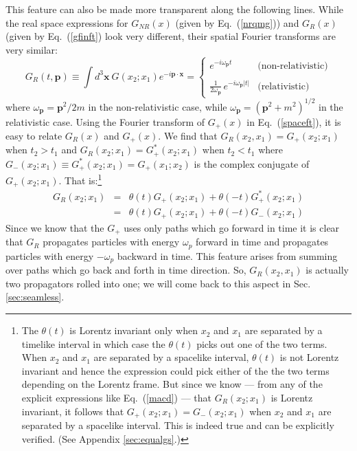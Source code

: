 \documentclass{article}
\def\eq#1{{Eq.~(\ref{#1})}}
\begin{document}
 
 
 


This feature can also be made more  transparent along the following lines. While the real space expressions for $G_{NR}(x)$ (given by \eq{nrqmg}) and $G_R(x)$ (given by \eq{gfinft} look very different, their spatial Fourier transforms are very   similar:
\begin{equation}
G_R(t,\bm{p}) \equiv \int d^3\bm{x}\ G(x_2;x_1) e^{-i\bm{p\cdot x}} = 
\begin{cases}
   e^{-i\omega_{\bm{p}}t} &\text{(non-relativistic)}\\
{ } \\
{\displaystyle{\frac{1}{2\omega_{\bm{p}}}}}\, e^{-i\omega_{\bm{p}}|t|} &\text{(relativistic)}
\end{cases}
\label{nrrcomp1}
\end{equation}
where $\omega_{\bm{p}}= \bm{p}^2/2m$ in the non-relativistic case, while $\omega_{\bm{p}}= (\bm{p}^2+m^2)^{1/2}$ in the relativistic case. 
Using the Fourier transform of $G_+(x)$ in \eq{spaceft}, it is easy to relate $G_R(x)$ and $G_+(x)$. We find that
$ G_R(x_2,x_1)=G_+(x_2;x_1)$ when $t_2>t_1$ and $G_R(x_2;x_1)=G_+^*(x_2;x_1)$ when $t_2<t_1$ where $G_-(x_2;x_1) \equiv  G_+^*(x_2;x_1)=G_+(x_1;x_2)$
is the complex conjugate of $G_+(x_2;x_1)$. That is:\footnote{The $\theta(t)$ is Lorentz invariant only when $x_2$ and $x_1$ are separated by a timelike interval in which case the $\theta(t)$ picks out one of the two terms. When $x_2$ and $x_1$ are separated by a spacelike interval, $\theta(t)$ is not Lorentz invariant and hence the expression could pick either of the the two terms depending on the Lorentz frame. But since we know --- from any of the explicit expressions like \eq{macd} --- that $G_R(x_2;x_1)$ is Lorentz invariant, it follows that $G_+(x_2;x_1)=G_-(x_2;x_1)$ when $x_2$ and $x_1$ are separated by a spacelike interval. This is indeed true and can be explicitly verified. (See Appendix \ref{sec:equalgs}.)}
\begin{eqnarray}
 G_R(x_2;x_1) &=& \theta(t) G_+(x_2;x_1) + \theta(-t)G_+^*(x_2;x_1)\nonumber\\
 &=& \theta(t) G_+(x_2;x_1) + \theta(-t)G_-(x_2;x_1)
\label{amppmnew}
\end{eqnarray}
Since we know that the $G_+$ uses only paths which go forward in time it is clear that
$G_R$ propagates particles with energy $\omega_p$ forward in time and propagates particles with energy $-\omega_p$ backward in time.
This feature arises from summing over paths which go back and forth in time direction.
So, $G_R(x_2,x_1)$ is actually two propagators rolled into one; we will come back to this aspect in Sec.\ref{sec:seamless}.
\end{document}
